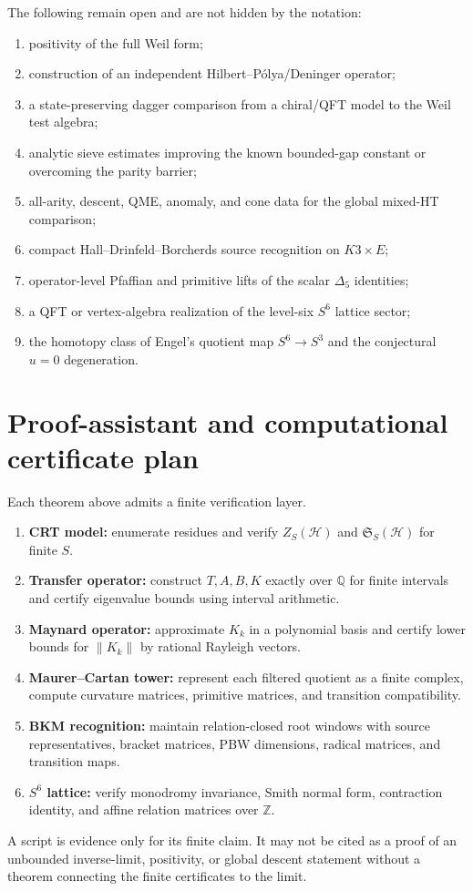 \documentclass[11pt]{article}
\theoremstyle{definition}
\theoremstyle{remark}
\newcommand{\ZZ}{\mathbb Z}
\newcommand{\QQ}{\mathbb Q}
\newcommand{\1}{\mathbf 1}
\newcommand{\cH}{\mathcal H}
\newcommand{\cS}{\mathfrak S}
\begin{document}
The following remain open and are not hidden by the notation:
\begin{enumerate}[label=(O\arabic*)]
\item positivity of the full Weil form;
\item construction of an independent Hilbert--P\'olya/Deninger operator;
\item a state-preserving dagger comparison from a chiral/QFT model to the Weil test algebra;
\item analytic sieve estimates improving the known bounded-gap constant or overcoming the parity barrier;
\item all-arity, descent, QME, anomaly, and cone data for the global mixed-HT comparison;
\item compact Hall--Drinfeld--Borcherds source recognition on $K3\times E$;
\item operator-level Pfaffian and primitive lifts of the scalar $\Delta_5$ identities;
\item a QFT or vertex-algebra realization of the level-six $S^6$ lattice sector;
\item the homotopy class of Engel's quotient map $S^6\to S^3$ and the conjectural $u=0$ degeneration.
\end{enumerate}

\section{Proof-assistant and computational certificate plan}

Each theorem above admits a finite verification layer.
\begin{enumerate}[label=(C\arabic*)]
\item \textbf{CRT model:} enumerate residues and verify $Z_S(\cH)$ and $\cS_S(\cH)$ for finite $S$.
\item \textbf{Transfer operator:} construct $T,A,B,K$ exactly over $\QQ$ for finite intervals and certify eigenvalue bounds using interval arithmetic.
\item \textbf{Maynard operator:} approximate $K_k$ in a polynomial basis and certify lower bounds for $\|K_k\|$ by rational Rayleigh vectors.
\item \textbf{Maurer--Cartan tower:} represent each filtered quotient as a finite complex, compute curvature matrices, primitive matrices, and transition compatibility.
\item \textbf{BKM recognition:} maintain relation-closed root windows with source representatives, bracket matrices, PBW dimensions, radical matrices, and transition maps.
\item \textbf{$S^6$ lattice:} verify monodromy invariance, Smith normal form, contraction identity, and affine relation matrices over $\ZZ$.
\end{enumerate}
A script is evidence only for its finite claim.  It may not be cited as a proof of an unbounded inverse-limit, positivity, or global descent statement without a theorem connecting the finite certificates to the limit.
\end{document}
